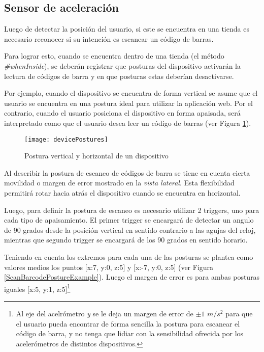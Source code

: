 \subsection{Sensor de aceleración}

Luego de detectar la posición del usuario, si este se encuentra en una tienda es necesario reconocer si su intención es escanear un código de barras.

Para lograr esto, cuando se encuentra dentro de una tienda (el método \emph{\#whenInside}), se deberán registrar que posturas del dispositivo activarán la lectura de códigos de barra y en que posturas estas deberían desactivarse.

Por ejemplo, cuando el dispositivo se encuentra de forma vertical se asume que el usuario se encuentra en una postura ideal para utilizar la aplicación web. Por el contrario, cuando el usuario posiciona el dispositivo en forma apaisada, será interpretado como que el usuario desea leer un código de barras (ver Figura \ref{devicePostures}).

\begin{figure}[ht!]
\centering
\texttt{[image: devicePostures]}
\caption{Postura vertical y horizontal de un dispositivo}
\label{devicePostures}
\end{figure}

Al describir la postura de escaneo de códigos de barra se tiene en cuenta cierta movilidad o margen de error mostrado en la \emph{vista lateral}. Esta flexibilidad permitirá rotar hacia atrás el dispositivo cuando se encuentra en horizontal.

Luego, para definir la postura de escaneo es necesario utilizar 2 triggers, uno para cada tipo de apaisamiento. El primer trigger se encargará de detectar un angulo de 90 grados desde la posición vertical en sentido contrario a las agujas del reloj, mientras que segundo trigger se encargará de los 90 grados en sentido horario.

Teniendo en cuenta los extremos para cada una de las posturas se plantea como valores medios los puntos [x:7, y:0, z:5] y [x:-7, y:0, z:5] (ver Figura \ref{ScanBarcodePostureExample}). Luego el margen de error es para ambas posturas iguales [x:5, y:1, z:5]\footnote{Al eje del acelrómetro \emph{y} se le deja un margen de error de $\pm1$ $m/s^2$ para que el usuario pueda encontrar de forma sencilla la postura para escanear el código de barra, y no tenga que lidiar con la sensibilidad ofrecida por los acelerómetros de distintos dispositivos.}

